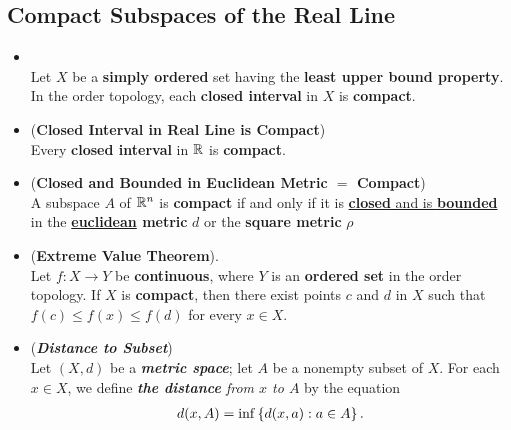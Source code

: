 \documentclass[11pt]{article}
\begin{document}
\subsection{Compact Subspaces of the Real Line}
\begin{itemize}
\item \begin{theorem}\citep{munkres2000topology}\\
Let $X$ be a \textbf{simply ordered} set having the \textbf{least upper bound property}. In the order topology, each \textbf{closed interval} in $X$ is \textbf{compact}.
\end{theorem}

\item \begin{corollary} (\textbf{Closed Interval in Real Line is Compact})\citep{munkres2000topology}\\
Every \textbf{closed interval} in ${\mathbb R}$ is \textbf{compact}.
\end{corollary}

\item \begin{proposition}  (\textbf{Closed and Bounded in Euclidean Metric $=$ Compact})\citep{munkres2000topology}\\
A subspace $A$ of ${\mathbb R}^n$ is \textbf{compact} if and only if it is \underline{\textbf{closed} and is \textbf{bounded}} in the \textbf{\underline{euclidean} metric} $d$ or the \textbf{square metric} $\rho$
\end{proposition}

\item \begin{theorem} (\textbf{Extreme Value Theorem}). \citep{munkres2000topology} \\
Let $f : X \rightarrow Y$ be \textbf{continuous}, where $Y$ is an \textbf{ordered set} in the order topology. If $X$ is \textbf{compact}, then there exist points $c$ and $d$ in $X$ such that $f(c) \le f(x) \le f (d)$ for every $x \in X$.
\end{theorem}

\item \begin{definition} (\emph{\textbf{Distance to Subset}})\\
Let $(X, d)$ be a \emph{\textbf{metric space}}; let $A$ be a nonempty subset of $X$. For each $x \in X$, we define \emph{\textbf{the distance} from $x$ to $A$} by the equation
\begin{align*}
d(x, A) = \inf\left\{d(x, a): a \in A\right\}.
\end{align*}
\end{definition}


\end{itemize}
\end{document}

